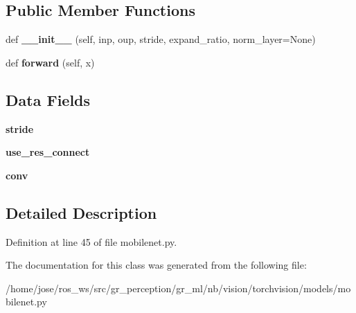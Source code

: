 \subsection*{Public Member Functions}
\begin{DoxyCompactItemize}
\item 
\mbox{\label{classtorchvision_1_1models_1_1mobilenet_1_1InvertedResidual_ab77a975606f31814fead7a0cbf0f4e4c}} 
def {\bfseries \+\_\+\+\_\+init\+\_\+\+\_\+} (self, inp, oup, stride, expand\+\_\+ratio, norm\+\_\+layer=None)
\item 
\mbox{\label{classtorchvision_1_1models_1_1mobilenet_1_1InvertedResidual_a24d6e4af5dc5cdf435efd618540c4fa8}} 
def {\bfseries forward} (self, x)
\end{DoxyCompactItemize}
\subsection*{Data Fields}
\begin{DoxyCompactItemize}
\item 
\mbox{\label{classtorchvision_1_1models_1_1mobilenet_1_1InvertedResidual_a8f93f6b926be3246ed35e1bf1f90514c}} 
{\bfseries stride}
\item 
\mbox{\label{classtorchvision_1_1models_1_1mobilenet_1_1InvertedResidual_a60dcc8185f476dadf7adc197e3f4607f}} 
{\bfseries use\+\_\+res\+\_\+connect}
\item 
\mbox{\label{classtorchvision_1_1models_1_1mobilenet_1_1InvertedResidual_a157b53ce1ba38f39e158a493012185f8}} 
{\bfseries conv}
\end{DoxyCompactItemize}


\subsection{Detailed Description}


Definition at line 45 of file mobilenet.\+py.



The documentation for this class was generated from the following file\+:\begin{DoxyCompactItemize}
\item 
/home/jose/ros\+\_\+ws/src/gr\+\_\+perception/gr\+\_\+ml/nb/vision/torchvision/models/mobilenet.\+py\end{DoxyCompactItemize}

